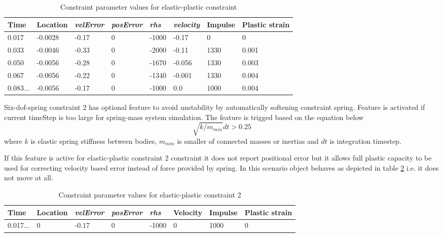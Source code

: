 \begin {table}[htb!]
\begin{center}
\begin{tabular}{|l|l| l| l|l|l|l|l|}
\hline
{\bf Time} & 
{\bf Location} &
{\it velError} & {\it posError} & {\it rhs} &
{\it velocity} & 
{\bf Impulse} & 
{\bf Plastic strain} \\  \hline
0.017 & -0.0028 &-0.17 & 0 & -1000 & -0.17 & 0 & 0 \\  \hline
0.033 & -0.0046 &-0.33 & 0 & -2000 & -0.11 &  1330 & 0.001 \\  \hline
0.050 & -0.0056 &-0.28 & 0 & -1670 & -0.056 &  1330 & 0.003 \\  \hline
0.067 & -0.0056 &-0.22 & 0 & -1340 &  -0.001&  1330 & 0.004\\  \hline
0.083... & -0.0056  & -0.17 & 0 & -1000 &  0.0&  1000 & 0.004\\  \hline
\end {tabular}
\end{center}
\caption {Constraint parameter values for elastic-plastic constraint} \label{tab:epBlockValues} 
\end {table}

Six-dof-spring constraint 2 has optional feature to avoid unstability by automatically softening constraint
spring. Feature is activated if current timeStep is too large for spring-mass system simulation.
The feature is trigged based on the equation below 
\begin{equation} \label{eq:frequencyLimited}
\sqrt{ k /  m_{min}} dt > 0.25 
\end{equation}
where $k$ is elastic spring stiffness between bodies,
$m_{min}$ is smaller of connected masses or inertias and $dt$ is integration timestep.

If this feature is active for elastic-plastic constraint 2 constraint  
it does not report positional error but it allows full plastic capacity to be used for correcting
velocity based error instead of force provided by spring.
In this scenario object behaves as depicted in table \ref{tab:ep2BlockValues} i.e. it does not move at all.

\begin {table}[htb!]
\begin{center}
\begin{tabular}{|l|l| l| l|l|l|l|l|}
\hline
{\bf Time} & 
{\bf Location} &
{\it velError} & {\it posError} & {\it rhs} &
{\bf Velocity} & 
{\bf Impulse} & 
{\bf Plastic strain} \\  \hline
0.017... &  0 & -0.17  & 0 & -1000 & 0       & 1000 & 0 \\  \hline
\end {tabular}
\end{center}
\caption {Constraint parameter values for elastic-plastic constraint 2} \label{tab:ep2BlockValues} 
\end {table}

